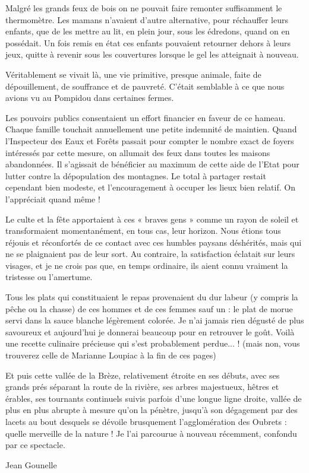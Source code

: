 
Malgré les grands feux de bois on ne pouvait faire remonter suffisamment le
thermomètre. Les mamans n’avaient d’autre alternative, pour réchauffer leurs enfants,
que de les mettre au lit, en plein jour, sous les édredons, quand on en possédait. Un
fois remis en état ces enfants pouvaient retourner dehors à leurs jeux, quitte à revenir
sous les couvertures lorsque le gel les atteignait à nouveau.

Véritablement se vivait là, une vie primitive, presque animale, faite de dépouillement,
de souffrance et de pauvreté. C’était semblable à ce que nous avions vu au Pompidou
dans certaines fermes.

Les pouvoirs publics consentaient un effort financier en faveur de ce hameau. Chaque
famille touchait annuellement une petite indemnité de maintien. Quand l’Inspecteur
des Eaux et Forêts passait pour compter le nombre exact de foyers intéressés par cette
mesure, on allumait des feux dans toutes les maisons abandonnées. Il s’agissait de
bénéficier au maximum de cette aide de l’Etat pour lutter contre la dépopulation des
montagnes. Le total à partager restait cependant bien modeste, et l’encouragement à
occuper les lieux bien relatif. On l’appréciait quand même !

Le culte et la fête apportaient à ces « braves gens » comme un rayon de soleil et
transformaient momentanément, en tous cas, leur horizon. Nous étions tous réjouis et
réconfortés de ce contact avec ces humbles paysans déshérités, mais qui ne se
plaignaient pas de leur sort. Au contraire, la satisfaction éclatait sur leurs visages, et
je ne crois pas que, en temps ordinaire, ils aient connu vraiment la tristesse ou
l’amertume.

Tous les plats qui constituaient le repas provenaient du dur labeur (y compris la pêche
ou la chasse) de ces hommes et de ces femmes sauf un : le plat de morue servi dans la
sauce blanche légèrement colorée. Je n’ai jamais rien dégusté de plus savoureux et
aujourd’hui je donnerai beaucoup pour en retrouver le goût. Voilà une recette
culinaire précieuse qui s’est probablement perdue... ! (mais non, vous trouverez celle de
Marianne Loupiac à la fin de ces pages)

Et puis cette vallée de la Brèze, relativement étroite en ses débuts, avec ses grands prés
séparant la route de la rivière, ses arbres majestueux, hêtres et érables, ses tournants
continuels suivis parfois d’une longue ligne droite, vallée de plus en plus abrupte à
mesure qu’on la pénètre, jusqu’à son dégagement par des lacets au bout desquels se
dévoile brusquement l’agglomération des Oubrets : quelle merveille de la nature ! Je
l’ai parcourue à nouveau récemment, confondu par ce spectacle.

\hfill Jean Gounelle
